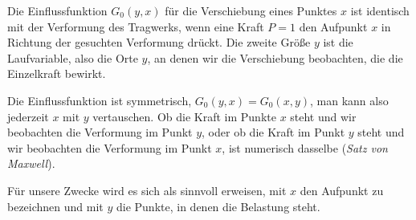Die Einflussfunktion $G_0(y,x)$ f\"{u}r die Verschiebung eines Punktes $x$ ist identisch mit der Verformung des Tragwerks, wenn eine Kraft $P = 1$ den Aufpunkt $x$ in Richtung der gesuchten Verformung dr\"{u}ckt. Die zweite Gr\"{o}{\ss}e $y$ ist die Laufvariable, also die Orte $y$, an denen wir die Verschiebung beobachten, die die Einzelkraft bewirkt.

Die Einflussfunktion ist symmetrisch, $G_0(y,x) = G_0(x,y)$, man kann also jederzeit $x$ mit $y$ vertauschen. Ob die Kraft im Punkte $x$ steht und wir beobachten die Verformung im Punkt $y $, oder ob die Kraft im Punkt $y$ steht und wir beobachten die Verformung im Punkt $x$, ist numerisch dasselbe ({\em Satz von Maxwell\/}).

F\"{u}r unsere Zwecke wird es sich als sinnvoll erweisen, mit $x$ den Aufpunkt zu bezeichnen und mit $y$ die Punkte, in denen die Belastung steht.


